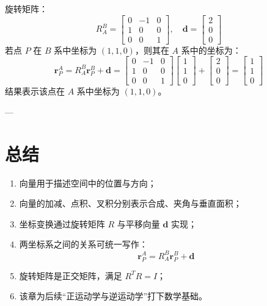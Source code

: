 \documentclass[12pt,a4paper]{article}
\begin{document}
\noindent
旋转矩阵：
\[
R_{A}^{B} =
\begin{bmatrix}
0 & -1 & 0\\
1 & 0 & 0\\
0 & 0 & 1
\end{bmatrix}, \quad
\boldsymbol{d} =
\begin{bmatrix}
2 \\ 0 \\ 0
\end{bmatrix}
\]
若点 $P$ 在 $B$ 系中坐标为 $(1,1,0)$，则其在 $A$ 系中的坐标为：
\[
\boldsymbol{r}_P^A =
R_{A}^{B}\boldsymbol{r}_P^B + \boldsymbol{d}
=
\begin{bmatrix}
0 & -1 & 0\\
1 & 0 & 0\\
0 & 0 & 1
\end{bmatrix}
\begin{bmatrix}
1 \\ 1 \\ 0
\end{bmatrix}
+
\begin{bmatrix}
2 \\ 0 \\ 0
\end{bmatrix}
=
\begin{bmatrix}
1 \\ 1 \\ 0
\end{bmatrix}
\]
结果表示该点在 $A$ 系中坐标为 $(1,1,0)$。

---

\section{总结}
\begin{enumerate}
  \item 向量用于描述空间中的位置与方向；
  \item 向量的加减、点积、叉积分别表示合成、夹角与垂直面积；
  \item 坐标变换通过旋转矩阵 $R$ 与平移向量 $\boldsymbol{d}$ 实现；
  \item 两坐标系之间的关系可统一写作：
  \[
  \boldsymbol{r}_P^A = R_{A}^{B}\boldsymbol{r}_P^B + \boldsymbol{d}
  \]
  \item 旋转矩阵是正交矩阵，满足 $R^T R = I$；
  \item 该章为后续“正运动学与逆运动学”打下数学基础。
\end{enumerate}
\end{document}
